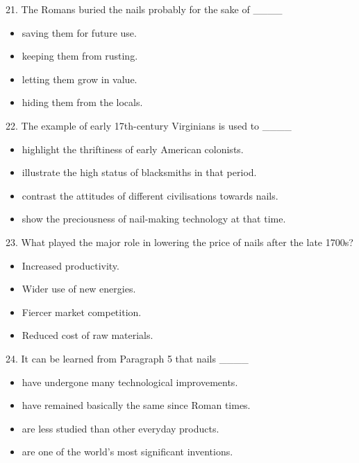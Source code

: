 \documentclass[UTF8,11pt]{ctexart}
\begin{document}
21. The Romans buried the nails probably for the sake of \_\_\_\_


\begin{itemize}[leftmargin=2em,itemsep=.2em,topsep=.4em]\item[A.] saving them for future use.
\item[B.] keeping them from rusting.
\item[C.] letting them grow in value.
\item[D.] hiding them from the locals.
\end{itemize}

22. The example of early 17th-century Virginians is used to \_\_\_\_


\begin{itemize}[leftmargin=2em,itemsep=.2em,topsep=.4em]\item[A.] highlight the thriftiness of early American colonists.
\item[B.] illustrate the high status of blacksmiths in that period.
\item[C.] contrast the attitudes of different civilisations towards nails.
\item[D.] show the preciousness of nail-making technology at that time.
\end{itemize}

23. What played the major role in lowering the price of nails after the late 1700s?


\begin{itemize}[leftmargin=2em,itemsep=.2em,topsep=.4em]\item[A.] Increased productivity.
\item[B.] Wider use of new energies.
\item[C.] Fiercer market competition.
\item[D.] Reduced cost of raw materials.
\end{itemize}

24. It can be learned from Paragraph 5 that nails \_\_\_\_


\begin{itemize}[leftmargin=2em,itemsep=.2em,topsep=.4em]\item[A.] have undergone many technological improvements.
\item[B.] have remained basically the same since Roman times.
\item[C.] are less studied than other everyday products.
\item[D.] are one of the world’s most significant inventions.
\end{itemize}
\end{document}
